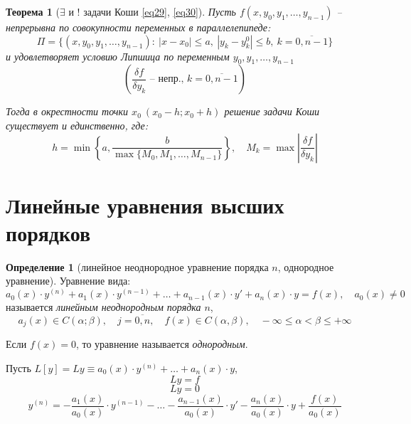 \documentclass[11pt,a4paper,oneside]{report}
\theoremstyle{definition}
\newtheorem{definition}{Определение}[section]
\theoremstyle{plain}
\newtheorem{theorem}{Теорема}[section]
\theoremstyle{remark}
\begin{document}
\begin{theorem}[$\exists$ и $!$ задачи Коши \ref{eq29}, \ref{eq30}]
    Пусть $f(x,y_0,y_1,\ldots,y_{n-1})$ -- непрерывна по совокупности переменных в параллелепипеде:
    \begin{equation*}
        \Pi = \big\{(x,y_0,y_1,\ldots,y_{n-1}): \ |x-x_0|\leqslant a, \ |y_k - y_k^0| \leqslant b, \ k = \overline{0,n-1}\big\}
    \end{equation*}
    и удовлетворяет условию Липшица по переменным $y_0,y_1,\ldots,y_{n-1}$
    \begin{equation*}
        \left(\frac{\delta f}{\delta y_k}\text{ -- непр., }k = \overline{0,n-1}\right)
    \end{equation*}

    Тогда в окрестности точки $x_0 \ (x_0 - h;x_0 + h)$ решение задачи Коши существует и единственно,  где:
    \begin{equation*}
        h = \min\left\{a,\frac{b}{\max\{M_0,M_1,\ldots,M_{n-1}\}}\right\}, \quad M_k = \max\left|\frac{\delta f}{\delta y_k}\right|
    \end{equation*}
\end{theorem}

\section{Линейные уравнения высших порядков}

\begin{definition}[линейное неоднородное уравнение порядка $n$, однородное уравнение]
    Уравнение вида:
    \begin{equation}\label{eq31}
        a_0(x) \cdot y^{(n)} + a_1(x) \cdot y^{(n-1)} + \ldots + a_{n-1}(x)\cdot y' + a_n(x) \cdot y = f(x), \quad a_0(x) \ne 0
    \end{equation}
    называется \emph{линейным неоднородным порядка $n$},
    \begin{equation*}
        a_j(x) \in C(\alpha;\beta), \quad j = \overline{0,n}, \quad f(x) \in C(\alpha, \beta), \quad -\infty \leqslant \alpha < \beta \leqslant + \infty
    \end{equation*}

    Если $f(x) = 0$, то уравнение называется \emph{однородным}.

    Пусть $L[y] = Ly \equiv a_0 (x) \cdot y^{(n)} + \ldots + a_n(x) \cdot y$,
    \begin{equation}\label{eq32}
        Ly = f
    \end{equation}
    \begin{equation}\label{eq33}
        Ly = 0
    \end{equation}
    \begin{equation}\label{eq34}
        y^{(n)} = - \frac{a_1(x)}{a_0(x)} \cdot y^{(n-1)} - \ldots - \frac{a_{n-1}(x)}{a_0(x)} \cdot y' - \frac{a_n(x)}{a_0(x)} \cdot y + \frac{f(x)}{a_0(x)}
    \end{equation}
\end{definition}
\end{document}
